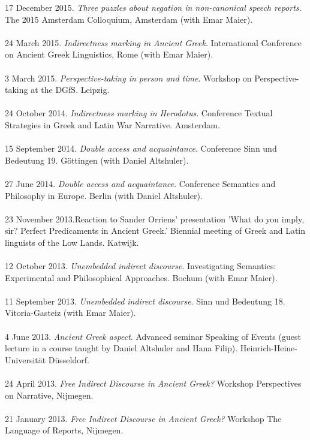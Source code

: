 \documentclass[a4paper,11pt]{article}
\begin{document}
17 December 2015. \emph{Three puzzles about negation in non-canonical speech reports.} The 2015 Amsterdam Colloquium, Amsterdam (with Emar Maier).\\\\
24 March 2015. \emph{Indirectness marking in Ancient Greek}. International Conference on Ancient Greek Linguistics, Rome (with Emar Maier).\\\\
3 March 2015. \emph{Perspective-taking in person and time}. Workshop on Perspective-taking at the DGfS. Leipzig.\\\\ 
24 October 2014. \emph{Indirectness marking in Herodotus}. Conference Textual Strategies in Greek and Latin War Narrative. Amsterdam.\\\\
15 September 2014. \emph{Double access and acquaintance}. Conference Sinn und Bedeutung 19. G\"ottingen (with Daniel Altshuler).\\\\
27 June 2014. \emph{Double access and acquaintance}. Conference Semantics and Philosophy in Europe. Berlin (with Daniel Altshuler).\\\\
23 November 2013.Reaction to Sander Orriens' presentation 'What do you imply, sir? Perfect Predicaments in Ancient Greek.' Biennial meeting of Greek and Latin linguists of the Low Lands. Katwijk.\\\\
12 October 2013. \emph{Unembedded indirect discourse}. Investigating Semantics: Experimental and Philosophical Approaches. Bochum (with Emar Maier).\\\\ 
11 September 2013. \emph{Unembedded indirect discourse}. Sinn und Bedeutung 18. Vitoria-Gasteiz (with Emar Maier). \\\\
4 June 2013. \emph{Ancient Greek aspect}. Advanced seminar Speaking of Events (guest lecture in a course taught by Daniel Altshuler and Hana Filip). Heinrich-Heine-Universit\"at D\"usseldorf.\\\\ 
24 April 2013. \emph{Free Indirect Discourse in Ancient Greek?} Workshop Perspectives on Narrative, Nijmegen.\\\\
21 January 2013. \emph{Free Indirect Discourse in Ancient Greek?} Workshop The Language of Reports, Nijmegen.\\\\
\end{document}
